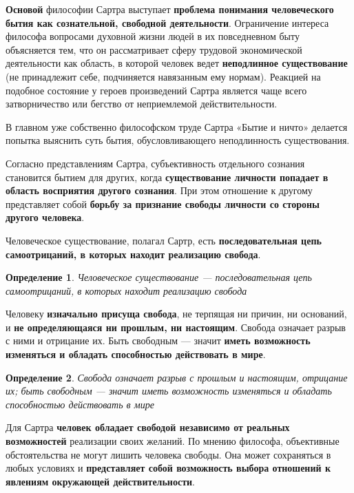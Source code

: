 \documentclass{article}
\newtheorem{definition}{Определение}
\begin{document}
\begin{flushleft}

\textbf{Основой} философии Сартра выступает \textbf{проблема понимания человеческого бытия как сознательной, свободной деятельности}. Ограничение интереса философа вопросами духовной жизни людей в их повседневном быту объясняется тем, что он рассматривает сферу трудовой экономической деятельности как область, в которой человек ведет \textbf{неподлинное существование} (не принадлежит себе, подчиняется навязанным ему нормам). Реакцией на подобное состояние у героев произведений Сартра является чаще всего затворничество или бегство от неприемлемой действительности.

\hfill

В главном уже собственно философском труде Сартра «Бытие и ничто» делается попытка выяснить суть бытия, обусловливающего неподлинность существования.

\hfill

Согласно представлениям Сартра, субъективность отдельного сознания становится бытием для других, когда \textbf{существование личности попадает в область восприятия другого сознания}. При этом отношение к другому представляет собой \textbf{борьбу за признание свободы личности со стороны другого человека}.

\hfill

Человеческое существование, полагал Сартр, есть \textbf{последовательная цепь самоотрицаний, в которых находит реализацию свобода}.

\begin{definition}
    Человеческое существование — последовательная цепь самоотрицаний, в которых находит реализацию свобода
\end{definition}

Человеку \textbf{изначально присуща свобода}, не терпящая ни причин, ни оснований, и \textbf{не определяющаяся ни прошлым, ни настоящим}. Свобода означает разрыв с ними и отрицание их. Быть свободным — значит \textbf{иметь возможность изменяться и обладать способностью действовать в мире}.

\begin{definition}
    Свобода означает разрыв с прошлым и настоящим, отрицание их; быть свободным — значит иметь возможность изменяться и обладать способностью действовать в мире
\end{definition}

Для Сартра \textbf{человек обладает свободой независимо от реальных возможностей} реализации своих желаний. По мнению философа, объективные обстоятельства не могут лишить человека свободы. Она может сохраняться в любых условиях и \textbf{представляет собой возможность выбора отношений к явлениям окружающей действительности}.


\end{flushleft}
\end{document}
